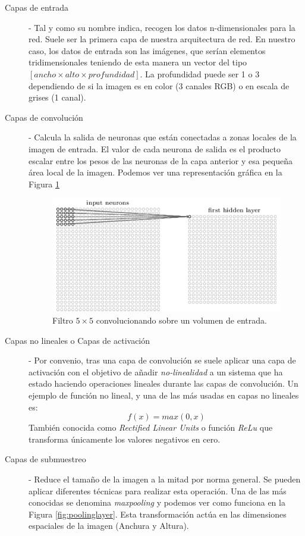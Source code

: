 \documentclass[a4paper,11pt]{book}
\begin{document}
\begin{description}
	\item [Capas de entrada \cite{cs231n}] - Tal y como su nombre indica, recogen los datos n-dimensionales para la red. Suele ser la primera capa de nuestra arquitectura de red. En nuestro caso, los datos de entrada son las imágenes, que serían elementos tridimensionales teniendo de esta manera un vector del tipo \([ancho \times alto \times profundidad]\). La profundidad puede ser 1 o 3 dependiendo de si la imagen es en color (3 canales RGB) o en escala de grises (1 canal).
	\item [Capas de convolución \cite{cs231n}] - Calcula la salida de neuronas que están conectadas a zonas locales de la imagen de entrada. El valor de cada neurona de salida es el producto escalar entre los pesos de las neuronas de la capa anterior y esa pequeña área local de la imagen. Podemos ver una representación gráfica en la Figura \ref{fig:convolutionlayer}
		\begin{figure}[h]
		\centering
		\includegraphics[width=0.7\linewidth]{imagenes/convolutionlayer}
		\caption[Convolution\cite{cs231n}]{Filtro \(5 \times 5\) convolucionando sobre un volumen de entrada\cite{deshpande16}.}
		\label{fig:convolutionlayer}
		\end{figure}
	\item [Capas no lineales o Capas de activación\cite{nair_hinton10,deshpande16b}] - Por convenio, tras una capa de convolución se suele aplicar una capa de activación con el objetivo de añadir \textit{no-linealidad} a un sistema que ha estado haciendo operaciones lineales durante las capas de convolución. Un ejemplo de función no lineal, y una de las más usadas en capas no lineales es:
	\[f(x) = max(0,x)\] 
	También conocida como \textit{Rectified Linear Units} o función \textit{ReLu} que transforma únicamente los valores negativos en cero.
	\item [Capas de submuestreo] - Reduce el tamaño de la imagen a la mitad por norma general. Se pueden aplicar diferentes técnicas para realizar esta operación. Una de las más conocidas se denomina \textit{maxpooling} y podemos ver como funciona en la Figura \ref{fig:poolinglayer}. Esta transformación actúa en las dimensiones espaciales de la imagen (Anchura y Altura).

\end{description}
\end{document}
